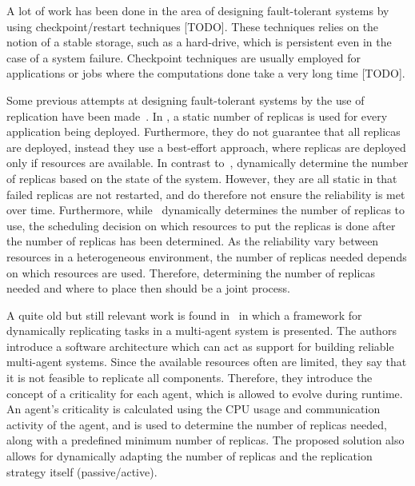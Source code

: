 \documentclass{cslthse-msc}
\begin{document}
A lot of work has been done in the area of designing fault-tolerant systems by using checkpoint/restart techniques [TODO]. %
These techniques relies on the notion of a stable storage, such as a hard-drive, which is persistent even in the case of a system failure. Checkpoint techniques are usually employed for applications or jobs where the computations done take a very long time [TODO].

Some previous attempts at designing fault-tolerant systems by the use of replication have been made~\cite{designFaultTolerantSched, evalReplicationSched, taskSchedulingReplication, effTaskReplMobGrid, relGridServicePredConstraint}. In \cite{evalReplicationSched}, a static number of replicas is used for every application being deployed. Furthermore, they do not guarantee that all replicas are deployed, instead they use a best-effort approach, where replicas are deployed only if resources are available. In contrast to~\cite{evalReplicationSched}, \cite{ effTaskReplMobGrid, taskSchedulingReplication, designFaultTolerantSched} dynamically determine the number of replicas based on the state of the system. However, they are all static in that failed replicas are not restarted, and do therefore not ensure the reliability is met over time. Furthermore, while~\cite{designFaultTolerantSched} dynamically determines the number of replicas to use, the scheduling decision on which resources to put the replicas is done after the number of replicas has been determined. As the reliability vary between resources in a heterogeneous environment, the number of replicas needed depends on which resources are used. Therefore, determining the number of replicas needed and where to place then should be a joint process.

A quite old but still relevant work is found in~\cite{dynAdaptRepl} in which a framework for dynamically replicating tasks in a multi-agent system is presented. The authors introduce a software architecture which can act as support for building reliable multi-agent systems. Since the available resources often are limited, they say that it is not feasible to replicate all components. Therefore, they introduce the concept of a criticality for each agent, which is allowed to evolve during runtime. An agent's criticality is calculated using the CPU usage and communication activity of the agent, and is used to determine the number of replicas needed, along with a predefined minimum number of replicas. The proposed solution also allows for dynamically adapting the number of replicas and the replication strategy itself (passive/active). %
\end{document}
